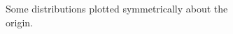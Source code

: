 \documentclass[
  11pt,
  numbers=noendperiod]{book}
\begin{document}
\begin{figure}

\begin{minipage}[t]{0.5\linewidth}

{\centering 


\caption*{Some distributions plotted symmetrically about the \\origin.}

}

\end{minipage}%
%
\begin{minipage}[t]{0.5\linewidth}

{\centering 

}
\end{minipage}
\end{figure}
\end{document}
